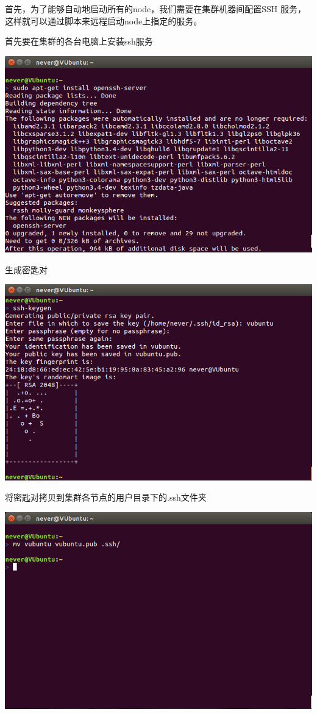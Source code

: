 首先，为了能够自动地启动所有的node，我们需要在集群机器间配置SSH
服务，这样就可以通过脚本来远程启动node上指定的服务。

首先要在集群的各台电脑上安装ssh服务

\includegraphics[width=\textwidth]{image/env/cr1.png}

生成密匙对

\includegraphics[width=\textwidth]{image/env/cr2.png}

将密匙对拷贝到集群各节点的用户目录下的.ssh文件夹

\includegraphics[width=\textwidth]{image/env/cr3.png}

